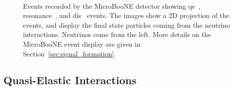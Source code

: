 \begin{figure}[]
\centering
{} \quad
{} \quad
{} \\
\caption[Neutrino Interaction Modes from MicroBooNE Event Displays]{Events recorded by the MicroBooNE detector showing \acrshort{qe}~, resonance~, and \acrshort{dis}~ events. The images show a 2D projection of the events, and display the final state particles coming from the neutrino interactions. Neutrinos come from the left. More details on the MicroBooNE event display are given in Section~\ref{sec:signal_formation}.}
\label{fig:evd_interactions}
\end{figure}





\subsection{Quasi-Elastic Interactions}
\label{sec:qe}

